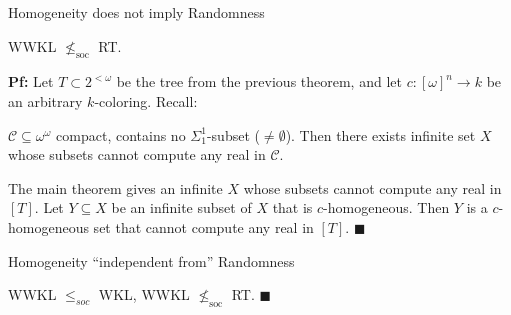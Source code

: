 \begin{frame}{Homogeneity does not imply Randomness}
  \begin{theorem}
    WWKL $\nleq_{\text{soc}}$ RT.
  \end{theorem}

  \vspace{1em}
  \textbf{Pf:} Let $T\subset2^{<\omega}$ be the tree from the previous
  theorem, and let $c:[\omega]^n\rightarrow k$ be an arbitrary
  $k$-coloring. Recall:
  \begin{main-thm*}
    $\mathcal{C}\subseteq\omega^\omega$ compact, contains no
    $\Sigma_1^1$-subset ($\neq\emptyset$). Then there exists infinite set
    $X$ whose subsets cannot compute any real in $\mathcal{C}$.
  \end{main-thm*}

  \vspace{1em}
  The main theorem gives an infinite $X$ whose subsets cannot compute any
  real in $[T]$. Let $Y\subseteq X$ be an infinite subset of $X$ that is
  $c$-homogeneous. Then $Y$ is a $c$-homogeneous set that cannot compute
  any real in $[T]$. $\blacksquare$
\end{frame}

\begin{frame}{Homogeneity ``independent from'' Randomness}
  \begin{coro}
    WWKL $\leq_{soc}$ WKL, WWKL $\nleq_{\text{soc}}$ RT. $\blacksquare$
  \end{coro}

  \vspace{2em}
  \begin{center}
  \end{center}
\end{frame}
